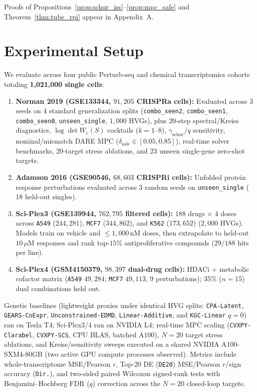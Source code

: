 \documentclass[journal]{IEEEtran}
\begin{document}
Proofs of Propositions~\ref{prop:schur_iss}--\ref{prop:mpc_safe} and Theorem~\ref{thm:tube_rpi} appear in Appendix~A.

\section{Experimental Setup}

We evaluate across four public Perturb-seq and chemical transcriptomics cohorts totaling \textbf{1,021,000 single cells}:
\begin{enumerate}
  \item \textbf{Norman 2019 (GSE133344, $91{,}205$ CRISPRa cells):} Evaluated across 3 seeds on 4 standard generalization splits (\texttt{combo\_\allowbreak seen2}, \texttt{combo\_\allowbreak seen1}, \texttt{combo\_\allowbreak seen0}, \texttt{unseen\_\allowbreak single}, $1{,}000$ HVGs), plus 20-step spectral/Kreiss diagnostics, $\log\det W_c(S)$ cocktails ($k=1\text{--}8$), $\gamma_{\mathrm{schur}}/q$ sensitivity, nominal/mismatch DARE MPC ($\delta_{\mathrm{safe}} \in [0.05, 0.85]$), real-time solver benchmarks, 20-target stress ablations, and 23 unseen single-gene zero-shot targets.
  \item \textbf{Adamson 2016 (GSE90546, $68{,}603$ CRISPRi cells):} Unfolded protein response perturbations evaluated across 3 random seeds on \texttt{unseen\_\allowbreak single} ($18$ held-out singles).
  \item \textbf{Sci-Plex3 (GSE139944, $762{,}795$ filtered cells):} $188$ drugs $\times$ $4$ doses across \texttt{A549} ($244{,}281$), \texttt{MCF7} ($344{,}862$), and \texttt{K562} ($173{,}652$) ($2{,}000$ HVGs). Models train on vehicle and $\le 1{,}000\,\mathrm{nM}$ doses, then extrapolate to held-out $10\,\mu\mathrm{M}$ responses and rank top-$15\%$ antiproliferative compounds ($29/188$ hits per line).
  \item \textbf{Sci-Plex4 (GSM4150379, $98{,}397$ dual-drug cells):} HDACi + metabolic cofactor matrix (\texttt{A549} $49{,}284$; \texttt{MCF7} $49{,}113$, $9$ perturbations); $35\%$ ($n=15$) dual combinations held out.
\end{enumerate}
Genetic baselines (lightweight proxies under identical HVG splits: \texttt{CPA-\allowbreak Latent}, \texttt{GEARS-\allowbreak CoExpr}, \texttt{Unconstrained-\allowbreak EDMD}, \texttt{Linear-\allowbreak Additive}, and \texttt{KGC-\allowbreak Linear} $q=0$) ran on Tesla T4; Sci-Plex3/4 ran on NVIDIA L4; real-time MPC scaling (\texttt{CVXPY-Clarabel}, \texttt{CVXPY-SCS}, CPU BLAS, batched A100), $N=20$ target stress ablations, and Kreiss/sensitivity sweeps executed on a shared NVIDIA A100-SXM4-80GB (two active GPU compute processes observed). Metrics include whole-transcriptome MSE/Pearson $r$, Top-20 DE (\texttt{DE20}) MSE/Pearson $r$/sign accuracy (\texttt{Dir.}), and two-sided paired Wilcoxon signed-rank tests with Benjamini--Hochberg FDR ($q$) correction across the $N=20$ closed-loop targets.
\end{document}

